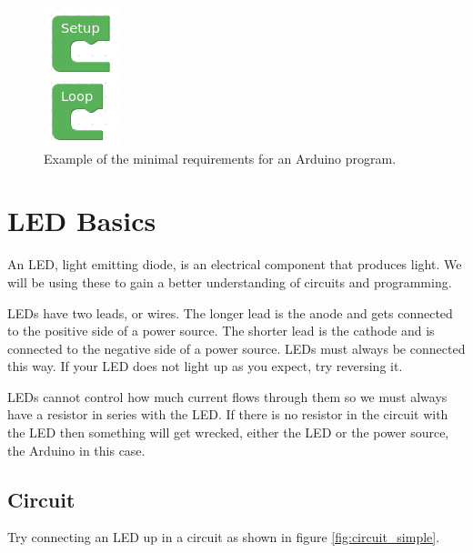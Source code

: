 \documentclass[12pt]{article}
\begin{document}
	\begin{figure}[H]
		\begin{center}
			\includegraphics[scale=0.7]{p_minimal_program}
			\caption{Example of the minimal requirements for an Arduino program.}
			\label{prog:minimal_program}
		\end{center}
	\end{figure}
	
	\section{LED Basics}
	
	An LED, light emitting diode, is an electrical component that produces light. We will be using these to gain a better understanding of circuits and programming.
	
	LEDs have two leads, or wires. The longer lead is the anode and gets connected to the positive side of a power source. The shorter lead is the cathode and is connected to the negative side of a power source. LEDs must always be connected this way. If your LED does not light up as you expect, try reversing it.
	
	LEDs cannot control how much current flows through them so we must always have a resistor in series with the LED. If there is no resistor in the circuit with the LED then something will get wrecked, either the LED or the power source, the Arduino in this case.
	
	\subsection{Circuit}
	
	Try connecting an LED up in a circuit as shown in figure \ref{fig:circuit_simple}.
	
\end{document}
